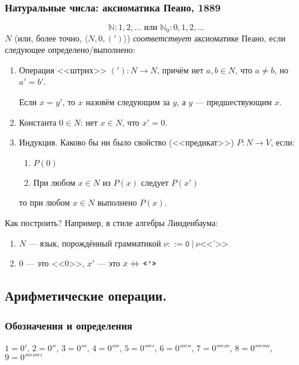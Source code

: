 \documentclass[10pt,a4paper,oneside]{article}
\newcommand\doubleplus{+\kern-1.3ex+\kern0.8ex}
\begin{document}
\subsubsection{Натуральные числа: аксиоматика Пеано, 1889}\vspace{-0.5cm}
 $$\mathbb{N}: 1, 2, \dots \mbox{ или } \mathbb{N}_0: 0, 1, 2, \dots$$\vspace{-1cm}
  $N$ (или, более точно, $\langle N, 0, (')\rangle$) \emph{соответствует} аксиоматике Пеано, 
  если следующее определено/выполнено:
  \begin{enumerate}
     \item Операция <<штрих>> $('): N \to N$, причём нет $a,b \in N$, что $a \ne b$, но $a' = b'$.
           
           Если $x = y'$, то $x$ назовём следующим за $y$, а $y$ --- предшествующим $x$.
     \item Константа $0 \in N$: нет $x \in N$, что $x' = 0$.
     \item Индукция. Каково бы ни было свойство (<<предикат>>) $P: N \to V$, если:
           \begin{enumerate}
           \item $P(0)$
           \item При любом $x\in N$ из $P(x)$ следует $P(x')$
           \end{enumerate}
           то при любом $x \in N$ выполнено $P(x)$.
  \end{enumerate}
Как построить? Например, в стиле алгебры Линденбаума:
\begin{enumerate}
\item $N$ --- язык, порождённый грамматикой $\nu ::= \texttt{0}\ |\ \nu \texttt{<<'>>}$
\item $0$ --- это $\text{<<0>>}$, $x'$ --- это $x \doubleplus \texttt{<<'>>}$
\end{enumerate}

\subsection{Арифметические операции.}

\subsubsection{Обозначения и определения}
$1 = 0'$, $2 = 0''$, $3 = 0'''$, $4 = 0''''$, $5 = 0'''''$, $6 = 0''''''$,
$7 = 0'''''''$, $8 = 0''''''''$, $9 = 0'''''''''$
\end{document}
